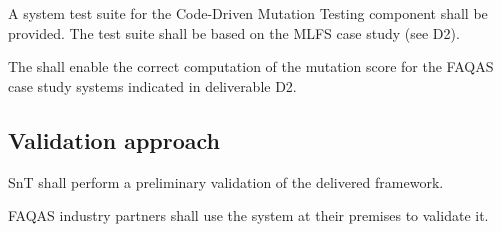  \RQ{} A system test suite for the Code-Driven Mutation Testing component shall be provided. The test suite shall be based on the MLFS case study (see D2).
 
 \RQ{} The \FAQAS shall enable the correct computation of the mutation score for the FAQAS case study systems indicated in deliverable D2.
 
 \subsection{Validation approach}

\RQ{} SnT shall perform a preliminary validation of the delivered framework.

\RQ{} FAQAS industry partners shall use the system at their premises to validate it.
